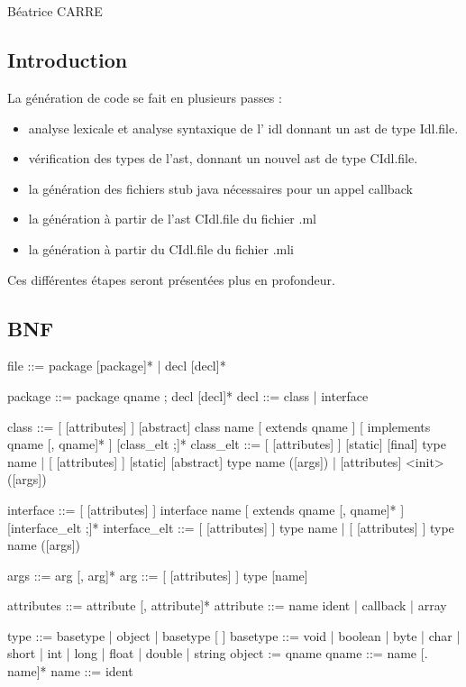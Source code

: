 \documentclass[a4paper, 11pt]{report}
\begin{document}
\chapter{}

Béatrice CARRE

\section*{Introduction}

La génération de code se fait en plusieurs passes :
\begin{itemize}
\item analyse lexicale et analyse syntaxique de l' idl donnant un
  ast de type Idl.file.
\item vérification des types de l'ast, donnant un nouvel ast de type
  CIdl.file.
\item la génération des fichiers stub java nécessaires pour un appel callback 
\item la génération à partir de l'ast CIdl.file du fichier .ml
\item la génération à partir du CIdl.file du fichier .mli
\end{itemize}
Ces différentes étapes seront présentées plus en profondeur.

\section{BNF}
\begin{multicols}{2}
\begin{idl}
file ::= package [package]*
  	| decl [decl]*
 
package	::= package qname ; decl [decl]*
decl ::= class
  	| interface
 
class ::= [ [attributes] ] [abstract] class name
  	  [ extends qname ]
  	  [ implements qname [, qname]* ]
  	  { [class_elt ;]* }
class_elt ::= [ [attributes] ] [static] [final] type name
  	| [ [attributes] ] [static] [abstract] type name ([args])
  	| [attributes] <init> ([args])
 
interface ::= [ [attributes] ] interface name
  	      [ extends qname [, qname]* ]
  	      { [interface_elt ;]* }
interface_elt ::= 
      [ [attributes] ] type name
      | [ [attributes] ] type name ([args])
 
args ::= arg [, arg]*
arg ::= [ [attributes] ] type [name]
 
attributes ::= 	attribute [, attribute]*
attribute ::= name ident
  	| callback
  	| array
 
type ::= basetype
  	| object
  	| basetype [ ]
basetype ::= void
  	| boolean
  	| byte
  	| char
  	| short
  	| int
  	| long
  	| float
  	| double
  	| string
object := qname
qname ::= name [. name]*
name ::= ident
\end{idl}
\end{multicols}
\end{document}

